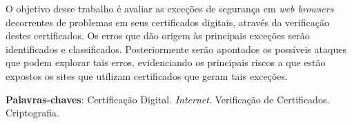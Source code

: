\begin{resumo}
	O objetivo desse trabalho é avaliar as exceções de segurança em \textit{web browsers} decorrentes de problemas em seus certificados digitais, através da verificação destes certificados. Os erros que dão origem às principais exceções serão identificados e classificados. Posteriormente serão apontados os possíveis ataques que podem explorar tais erros, evidenciando os principais riscos a que estão expostos os sites que utilizam certificados que geram tais exceções.

\vspace{\onelineskip}
    
\noindent
\textbf{Palavras-chaves}: Certificação Digital. \textit{Internet}. Verificação de Certificados. Criptografia.
\end{resumo}
